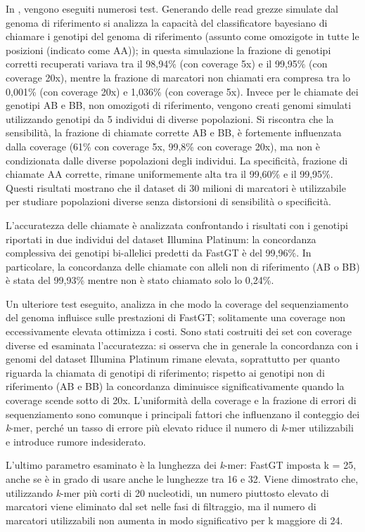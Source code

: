 \documentclass[../main.tex]{subfiles}
\begin{document}
In \cite{pajuste2017fastgt}, vengono eseguiti numerosi test. Generando delle read grezze simulate dal genoma di riferimento si analizza la capacità del classificatore bayesiano di chiamare i genotipi del genoma di riferimento (assunto come omozigote in tutte le posizioni (indicato come AA)); in questa simulazione la frazione di genotipi corretti recuperati variava tra il 98,94\% (con coverage 5x) e il 99,95\% (con coverage 20x), mentre la frazione di marcatori non chiamati era compresa tra lo 0,001\% (con coverage 20x) e 1,036\% (con coverage 5x). Invece per le chiamate dei genotipi AB e BB, non omozigoti di riferimento, vengono creati genomi simulati utilizzando genotipi da 5 individui di diverse popolazioni. Si riscontra che la sensibilità, la frazione di chiamate corrette AB e BB, è fortemente influenzata dalla coverage (61\% con coverage 5x, 99,8\% con coverage 20x), ma non è condizionata dalle diverse popolazioni degli individui. La specificità, frazione di chiamate AA corrette, rimane uniformemente alta tra il 99,60\% e il 99,95\%. Questi risultati mostrano che il dataset di 30 milioni di marcatori è utilizzabile per studiare popolazioni diverse senza distorsioni di sensibilità o specificità.

L'accuratezza delle chiamate è analizzata confrontando i risultati con i genotipi riportati in due individui del dataset Illumina Platinum: la concordanza complessiva dei genotipi bi-allelici predetti da FastGT è del 99,96\%. In particolare, la concordanza delle chiamate con alleli non di riferimento (AB o BB) è stata del 99,93\% mentre non è stato chiamato solo lo 0,24\%.

Un ulteriore test eseguito, analizza in che modo la coverage del sequenziamento del genoma influisce sulle prestazioni di FastGT; solitamente una coverage non eccessivamente elevata ottimizza i costi. Sono stati costruiti dei set con coverage diverse ed esaminata l'accuratezza: si osserva che in generale la concordanza con i genomi del dataset Illumina Platinum rimane elevata, soprattutto per quanto riguarda la chiamata di genotipi di riferimento; rispetto ai genotipi non di riferimento (AB e BB) la concordanza diminuisce significativamente quando la coverage scende sotto di 20x. L'uniformità della coverage e la frazione di errori di sequenziamento sono comunque i principali fattori che influenzano il conteggio dei \textit{k}-mer, perché un tasso di errore più elevato riduce il numero di \textit{k}-mer utilizzabili e introduce rumore indesiderato. 

L'ultimo parametro esaminato è la lunghezza dei \textit{k}-mer: FastGT imposta k = 25, anche se è in grado di usare anche le lunghezze tra 16 e 32. Viene dimostrato che, utilizzando \textit{k}-mer più corti di 20 nucleotidi, un numero piuttosto elevato di marcatori viene eliminato dal set nelle fasi di filtraggio, ma il numero di marcatori utilizzabili non aumenta in modo significativo per k maggiore di 24.
\end{document}
